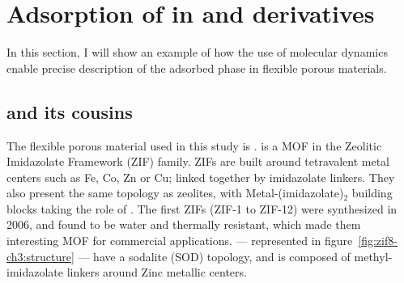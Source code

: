 \documentclass[thesis]{subfiles}
\begin{document}

\clearpage
\section{Adsorption of  in  and derivatives}

In this section, I will show an example of how the use of \abinitio molecular
dynamics enable precise description of the adsorbed phase in flexible porous
materials.

\subsection{ and its cousins}

The flexible porous material used in this study is .  is a MOF in the
Zeolitic Imidazolate Framework (ZIF) family. ZIFs are built around tetravalent
metal centers such as Fe, Co, Zn or Cu; linked together by imidazolate linkers.
They also present the same topology as zeolites, with Metal-(imidazolate)$_2$
building blocks taking the role of . The first ZIFs (ZIF-1 to ZIF-12)
were synthesized in 2006\cite{Park2006}, and found to be water and thermally
resistant, which made them interesting MOF for commercial applications. 
--- represented in figure~\ref{fig:zif8-ch3:structure} --- have a sodalite (SOD)
topology, and is composed of methyl-imidazolate linkers around Zinc metallic
centers.
\end{document}
